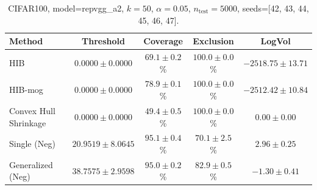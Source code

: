 \begin{table}[h!]
\centering
\caption{CIFAR100, model=repvgg_a2, $k=50$, $\alpha=0.05$, $n_\mathrm{test}=5000$, seeds=[42, 43, 44, 45, 46, 47].}
\tiny
\begin{tabular}{lcccc}
\toprule
\textbf{Method} & \textbf{Threshold} & \textbf{Coverage} & \textbf{Exclusion} & \textbf{LogVol} \\
\midrule
HIB 
& $0.0000 \pm 0.0000$ 
& $69.1 \pm 0.2$\% 
& $100.0 \pm 0.0$\% 
& $-2518.75 \pm 13.71$ \\
HIB-mog 
& $0.0000 \pm 0.0000$ 
& $78.9 \pm 0.1$\% 
& $100.0 \pm 0.0$\% 
& $-2512.42 \pm 10.84$ \\
Convex Hull Shrinkage 
& $0.0000 \pm 0.0000$ 
& $49.4 \pm 0.5$\% 
& $100.0 \pm 0.0$\% 
& $0.00 \pm 0.00$ \\
Single (Neg) 
& $20.9519 \pm 8.0645$ 
& $95.1 \pm 0.4$\% 
& $70.1 \pm 2.5$\% 
& $2.96 \pm 0.25$ \\
Generalized (Neg) 
& $38.7575 \pm 2.9598$ 
& $95.0 \pm 0.2$\% 
& $82.9 \pm 0.5$\% 
& $-1.30 \pm 0.41$ \\
\bottomrule
\end{tabular}
\end{table}
